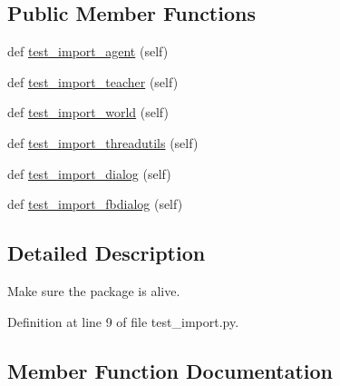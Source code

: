 \subsection*{Public Member Functions}
\begin{DoxyCompactItemize}
\item 
def \hyperlink{classtests_1_1test__import_1_1TestImport_acfd2119a3ad738cad370cf72ef7e7423}{test\+\_\+import\+\_\+agent} (self)
\item 
def \hyperlink{classtests_1_1test__import_1_1TestImport_af48db1b740c81424df27e10c66481770}{test\+\_\+import\+\_\+teacher} (self)
\item 
def \hyperlink{classtests_1_1test__import_1_1TestImport_a7eb4091dcd3395e147659ec3a49be488}{test\+\_\+import\+\_\+world} (self)
\item 
def \hyperlink{classtests_1_1test__import_1_1TestImport_a3a90634703bb67d0bb0b3ac5352657ad}{test\+\_\+import\+\_\+threadutils} (self)
\item 
def \hyperlink{classtests_1_1test__import_1_1TestImport_a5dcc13dee044ad4be07523f024b13db2}{test\+\_\+import\+\_\+dialog} (self)
\item 
def \hyperlink{classtests_1_1test__import_1_1TestImport_ad030b185d0f0b02e1d8606d578d48820}{test\+\_\+import\+\_\+fbdialog} (self)
\end{DoxyCompactItemize}


\subsection{Detailed Description}
\begin{DoxyVerb}Make sure the package is alive.
\end{DoxyVerb}
 

Definition at line 9 of file test\+\_\+import.\+py.



\subsection{Member Function Documentation}
\mbox{\label{classtests_1_1test__import_1_1TestImport_acfd2119a3ad738cad370cf72ef7e7423}} 
